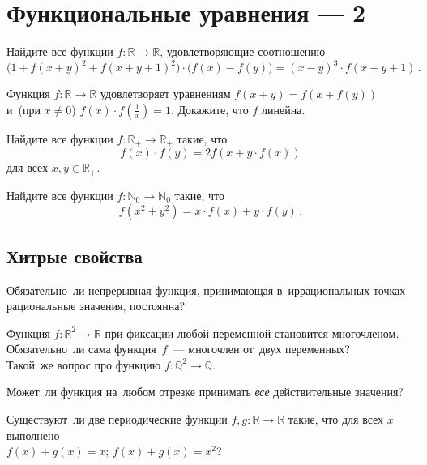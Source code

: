 
\section*{Функциональные уравнения --- 2}



\begin{problems}

Найдите все функции $f \colon \mathbb{R} \to \mathbb{R}$, удовлетворяющие
соотношению
\[
    \bigl(
        1 + f(x + y)^2 + f(x + y + 1)^2
    \bigr)
    \cdot
    \bigl(
        f(x) - f(y)
    \bigr)
=
    (x - y)^3 \cdot f(x + y + 1)
\,.\]

\item
Функция $f \colon \mathbb{R} \to \mathbb{R}$ удовлетворяет уравнениям
$f(x + y) = f(x + f(y))$ и~(при $x \neq 0$) $f(x) \cdot f(\frac{1}{x}) = 1$.
Докажите, что $f$ линейна. 

\item
Найдите все функции $f \colon \mathbb{R}_+ \to \mathbb{R}_+$ такие, что
\[
    f(x) \cdot f(y)
=
    2 f(x + y \cdot f(x))
\]
для всех $x, y \in \mathbb{R}_+$.

\item
Найдите все функции $f \colon \mathbb{N}_0 \to \mathbb{N}_0$ такие, что
\[
    f(x^2 + y^2)
=
    x \cdot f(x) + y \cdot f(y)
\,.\]

\subsection*{Хитрые свойства}

\item
Обязательно~ли непрерывная функция, принимающая в~иррациональных точках
рациональные значения, постоянна? 

\item
\sp
Функция $f \colon \mathbb{R}^2 \to \mathbb{R}$ при фиксации любой переменной
становится многочленом.
Обязательно~ли сама функция~$f$~--- многочлен от~двух переменных?
\\
\sp
Такой~же вопрос про функцию $f \colon \mathbb{Q}^2 \to \mathbb{Q}$.

\item
Может~ли функция на~любом отрезке принимать \emph{все} действительные значения?

\item
Существуют~ли две периодические функции $f, g \colon \mathbb{R} \to \mathbb{R}$
такие, что для всех $x$ выполнено
\\
\sp $f(x) + g(x) = x$;
\qquad
\sp $f(x) + g(x) = x^2$?

\end{problems}

